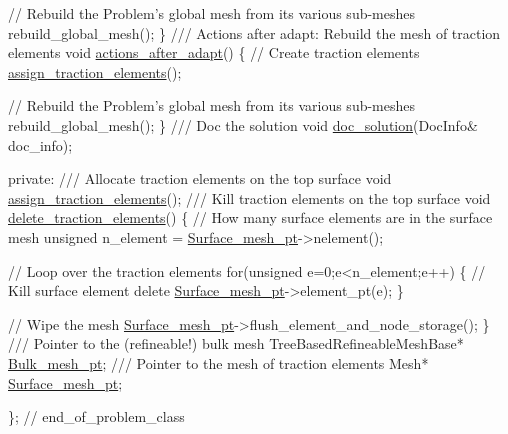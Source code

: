 \begin{DoxyCodeInclude}
   \textcolor{comment}{// Rebuild the Problem's global mesh from its various sub-meshes}
   rebuild\_global\_mesh();
  \}
\textcolor{comment}{}
\textcolor{comment}{ /// Actions after adapt: Rebuild the mesh of traction elements}
\textcolor{comment}{} \textcolor{keywordtype}{void} \hyperlink{classRefineablePeriodicLoadProblem_ad4fdb5d3805ea8dec6cedf515e5a73d7}{actions\_after\_adapt}()
  \{
   \textcolor{comment}{// Create traction elements}
   \hyperlink{classRefineablePeriodicLoadProblem_a0de046a3d8a5d88f01d782fdc1be82a0}{assign\_traction\_elements}();

   \textcolor{comment}{// Rebuild the Problem's global mesh from its various sub-meshes}
   rebuild\_global\_mesh();
  \}
\textcolor{comment}{}
\textcolor{comment}{ /// Doc the solution}
\textcolor{comment}{} \textcolor{keywordtype}{void} \hyperlink{classRefineablePeriodicLoadProblem_ac10c477b8edd2d0b7d3a69e65184356a}{doc\_solution}(DocInfo& doc\_info);

\textcolor{keyword}{private}:
\textcolor{comment}{}
\textcolor{comment}{ /// Allocate traction elements on the top surface}
\textcolor{comment}{} \textcolor{keywordtype}{void} \hyperlink{classRefineablePeriodicLoadProblem_a0de046a3d8a5d88f01d782fdc1be82a0}{assign\_traction\_elements}();
 \textcolor{comment}{}
\textcolor{comment}{ /// Kill traction elements on the top surface}
\textcolor{comment}{} \textcolor{keywordtype}{void} \hyperlink{classRefineablePeriodicLoadProblem_a491998bff6616edaa5e29bf155d0284b}{delete\_traction\_elements}()
  \{
   \textcolor{comment}{// How many surface elements are in the surface mesh}
   \textcolor{keywordtype}{unsigned} n\_element = \hyperlink{classRefineablePeriodicLoadProblem_a760d47dad3385febb9bd893afda424c2}{Surface\_mesh\_pt}->nelement();
   
   \textcolor{comment}{// Loop over the traction elements}
   \textcolor{keywordflow}{for}(\textcolor{keywordtype}{unsigned} e=0;e<n\_element;e++)
    \{
     \textcolor{comment}{// Kill surface element}
     \textcolor{keyword}{delete} \hyperlink{classRefineablePeriodicLoadProblem_a760d47dad3385febb9bd893afda424c2}{Surface\_mesh\_pt}->element\_pt(e);
    \}
   
   \textcolor{comment}{// Wipe the mesh}
   \hyperlink{classRefineablePeriodicLoadProblem_a760d47dad3385febb9bd893afda424c2}{Surface\_mesh\_pt}->flush\_element\_and\_node\_storage();
  \}
 \textcolor{comment}{}
\textcolor{comment}{ /// Pointer to the (refineable!) bulk mesh}
\textcolor{comment}{} TreeBasedRefineableMeshBase* \hyperlink{classRefineablePeriodicLoadProblem_a98440a404cb3de29aad5a93f768889cd}{Bulk\_mesh\_pt};
\textcolor{comment}{}
\textcolor{comment}{ /// Pointer to the mesh of traction elements}
\textcolor{comment}{} Mesh* \hyperlink{classRefineablePeriodicLoadProblem_a760d47dad3385febb9bd893afda424c2}{Surface\_mesh\_pt};

\}; \textcolor{comment}{// end\_of\_problem\_class}

\end{DoxyCodeInclude}




